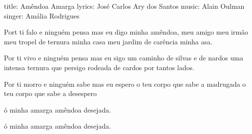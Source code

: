 title: Amêndoa Amarga
lyrics: José Carlos Ary dos Santos
music: Alain Oulman 
singer: Amália Rodrigues

Port ti falo
e ninguém pensa
mas eu digo
minha amêndoa, meu amigo
meu irmão
meu tropel de ternura
minha casa
meu jardim de carência
minha asa.

Por ti vivo
e ninguém pensa
mas eu sigo
um caminho de silvas
e de nardos
uma intensa ternura
que persigo
rodeada de cardos
por tantos lados.

Por ti morro
e ninguém sabe
mas eu espero 
o teu corpo que sabe 
a madrugada
o teu corpo que sabe
a desespero

ó minha amarga amêndoa 
desejada.

ó minha amarga amêndoa
desejada.